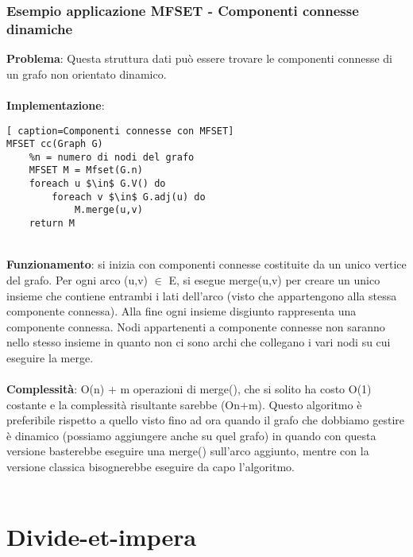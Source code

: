 \documentclass[../cheatSheetAlgoritmi.tex]{subfiles}
\begin{document}
\subsubsection{Esempio applicazione MFSET - Componenti connesse dinamiche}
\textbf{Problema}: Questa struttura dati può essere trovare le componenti connesse di un grafo non orientato dinamico.\\\\
\textbf{Implementazione}:
\begin{lstlisting}[ caption=Componenti connesse con MFSET]
MFSET cc(Graph G)
	%n = numero di nodi del grafo
	MFSET M = Mfset(G.n)
	foreach u $\in$ G.V() do
		foreach v $\in$ G.adj(u) do
			M.merge(u,v)
	return M
\end{lstlisting} 
\textbf{\\Funzionamento}: si inizia con componenti connesse costituite da un unico vertice del grafo. Per ogni arco (u,v) $\in$ E, si esegue merge(u,v) per creare un unico insieme che contiene entrambi i lati dell'arco (visto che appartengono alla stessa componente connessa). Alla fine ogni insieme disgiunto rappresenta una componente connessa. Nodi appartenenti a componente connesse non saranno nello stesso insieme in quanto non ci sono archi che collegano i vari nodi su cui eseguire la merge.\\\\
\textbf{Complessità}: O(n) + m operazioni di merge(), che si solito ha costo O(1) costante e la complessità risultante sarebbe (On+m). Questo algoritmo è preferibile rispetto a quello visto fino ad ora quando il grafo che dobbiamo gestire è dinamico (possiamo aggiungere anche su quel grafo) in quando con questa versione basterebbe eseguire una merge() sull'arco aggiunto, mentre con la versione classica bisognerebbe eseguire da capo l'algoritmo. \\\\

\newpage
\section{Divide-et-impera}
\end{document}
